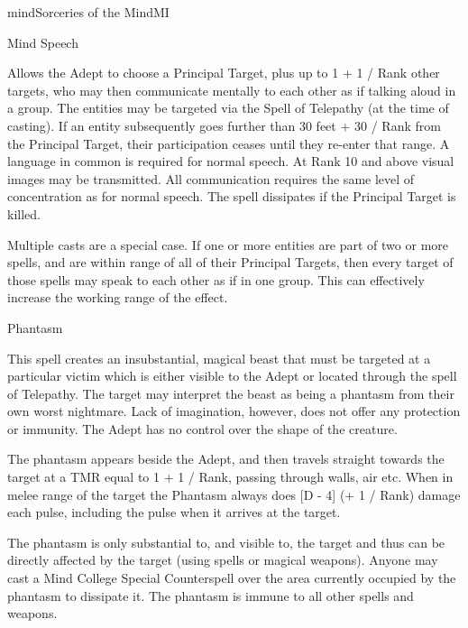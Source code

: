 \begin{College}[1.6]{mind}{Sorceries of the Mind}{MI}
\begin{spell}[S-5]{Mind Speech}

\begin{effects}
Allows the Adept to choose a Principal Target, plus up to 1 + 1 / Rank
other targets, who may then communicate mentally to each other as if
talking aloud in a group.  The entities may be targeted via the Spell
of Telepathy (at the time of casting). If an entity subsequently goes
further than 30 feet + 30 / Rank from the Principal Target, their
participation ceases until they re-enter that range.  A language in
common is required for normal speech.  At Rank 10 and above visual
images may be transmitted.  All communication requires the same level
of concentration as for normal speech.  The spell dissipates if the
Principal Target is killed.

Multiple casts are a special case.  If one or more entities are part
of two or more spells, and are within range of all of their Principal
Targets, then every target of those spells may speak to each other as
if in one group. This can effectively increase the working range of
the effect.
\end{effects}
\end{spell}

\begin{spell}[S-6]{Phantasm}

\begin{effects}
This spell creates an insubstantial, magical beast that must be
targeted at a particular victim which is either visible to the Adept
or located through the spell of Telepathy.  The target may interpret
the beast as being a phantasm from their own worst nightmare.  Lack of
imagination, however, does not offer any protection or immunity.
The Adept has no control over the shape of the creature.

The phantasm appears beside the Adept, and then travels straight
towards the target at a TMR equal to 1 + 1 / Rank, passing through
walls, air etc.  When in melee range of the target the Phantasm always
does [D - 4] (+ 1 / Rank) damage each pulse, including the pulse when
it arrives at the target.

The phantasm is only substantial to, and visible to, the target and
thus can be directly affected by the target (using spells or magical
weapons).  Anyone may cast a Mind College Special Counterspell over
the area currently occupied by the phantasm to dissipate it.  The
phantasm is immune to all other spells and weapons.


\end{effects}
\end{spell}
\end{College}

